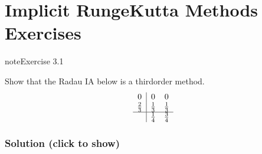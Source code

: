 \documentclass[letterpaper,10pt,english]{jupyterBook}
\begin{document}
\sphinxstepscope


\section{Implicit Runge\sphinxhyphen{}Kutta Methods Exercises}
\label{\detokenize{3_IRKs/3.4_IRK_exercises:implicit-runge-kutta-methods-exercises}}\label{\detokenize{3_IRKs/3.4_IRK_exercises::doc}}
\begin{sphinxadmonition}{note}{Exercise 3.1}

\sphinxAtStartPar
Show that the Radau IA below is a third\sphinxhyphen{}order method.
\begin{align*}
    \begin{array}{c|cc}
      0 & 0 & 0 \\
      \tfrac{2}{3} & \tfrac{1}{3} & \tfrac{1}{3} \\ \hline
      & \tfrac{1}{4} & \tfrac{3}{4}
    \end{array}
\end{align*}\subsubsection*{Solution (click to show)}


\end{sphinxadmonition}
\end{document}
